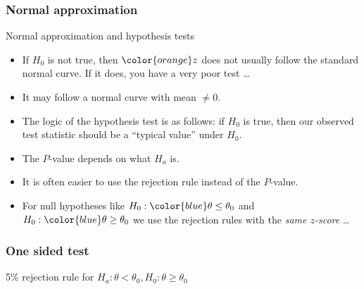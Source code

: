 \documentclass[handout]{beamer}
\begin{document}
   \begin{frame} \frametitle{Normal approximation}

    \begin{block}
     {Normal approximation and hypothesis tests}
     \begin{itemize}
     \item If $H_0$ is not true, then ${\color{orange} z}$ does not usually follow the standard normal curve. If it does, you have a very poor test \dots

     \item It may follow a normal curve with mean $\neq 0$.

     \item The logic of the hypothesis test is as follows: if $H_0$ is true, then
     our observed test statistic should be a ``typical value'' under $H_0$.

     \item The {\color{orange} $P$-value} depends on what $H_a$ is.

     \item It is often easier to use the rejection rule instead
     of the $P$-value.

     \item For null hypotheses like $H_0:{\color{blue} \theta \leq \theta_0}$ and
     $H_0:{\color{blue} \theta \geq \theta_0}$ we use the rejection rules with
     the {\em \color{orange} same  $z$-score} \dots

     \end{itemize}
   \end{block}
   \end{frame}



   \begin{frame}
   \frametitle{One sided test}
   \begin{center}
   \end{center}
   {\color{blue} 5\% rejection rule} for $H_a: \theta < \theta_0, H_0:\theta \geq \theta_0$
   \end{frame}
\end{document}

